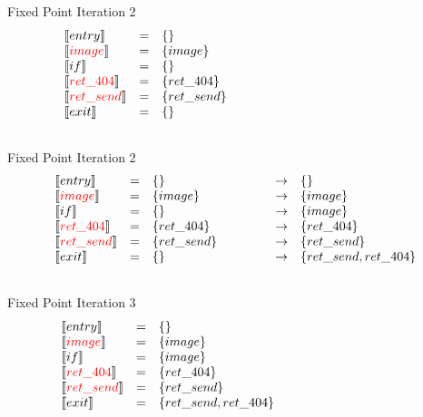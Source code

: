 \begin{frame}{Fixed Point Iteration 2}
\[
\begin{array}{lclcl}
  \constraint{entry} & = & \{\} &&\\
  \assignconstraint{image} & = & \{image\} &&\\
  \constraint{if} & = & \{\} &&\\
  \assignconstraint{ret\_404} & = & \{ret\_404\} &&\\
  \assignconstraint{ret\_send} & = & \{ret\_send\} &&\\
  \constraint{exit} & = & \{\} &&\\
  && \phantom{\{command, param\}} && \phantom{\{command, param\}}
\end{array}
\]
\end{frame}

\begin{frame}{Fixed Point Iteration 2}
\[
\begin{array}{lclcl}
  \constraint{entry} & = & \{\} & \rightarrow & \{\}\\
  \assignconstraint{image} & = & \{image\} & \rightarrow &\{image\}\\
  \constraint{if} & = & \{\} & \rightarrow &\{image\}\\
  \assignconstraint{ret\_404} & = & \{ret\_404\} & \rightarrow &\{ret\_404\}\\
  \assignconstraint{ret\_send} & = & \{ret\_send\} & \rightarrow &\{ret\_send\}\\
  \constraint{exit} & = & \{\} & \rightarrow & \{ret\_send, ret\_404\}\\
  && \phantom{\{command, param\}} && \phantom{\{command, param\}}
\end{array}
\]
\end{frame}

\begin{frame}{Fixed Point Iteration 3}
\[
\begin{array}{lclcl}
  \constraint{entry} & = & \{\} &&\\
  \assignconstraint{image} & = & \{image\} &&\\
  \constraint{if} & = & \{image\} &&\\
  \assignconstraint{ret\_404} & = & \{ret\_404\} &&\\
  \assignconstraint{ret\_send} & = & \{ret\_send\} &&\\
  \constraint{exit} & = & \{ret\_send, ret\_404\} &&\\
  && \phantom{\{command, param\}} && \phantom{\{command, param\}}
\end{array}
\]
\end{frame}

